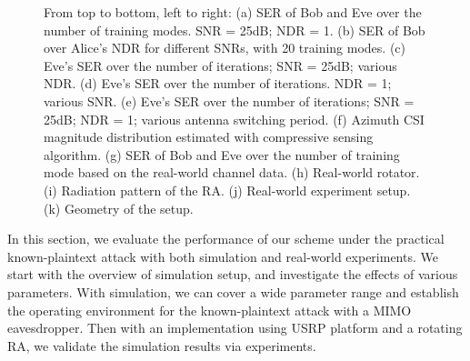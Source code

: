 \begin{figure}[t]
\begin{subfigure}[t]{0.22\textwidth}
\end{subfigure}
\caption{From top to bottom, left to right: (a) SER of Bob and Eve over the number of training modes. SNR = 25dB; NDR = 1. (b) SER of Bob over Alice's NDR for different SNRs, with 20 training modes. (c) Eve's SER over the number of iterations; SNR = 25dB; various NDR. (d) Eve's SER over the number of iterations. NDR = 1; various SNR. (e) Eve's SER over the number of iterations; SNR = 25dB; NDR = 1; various antenna switching period. (f) Azimuth CSI magnitude distribution estimated with compressive
sensing algorithm. (g) SER of Bob and Eve over the number of training mode based on the real-world channel data. (h) Real-world rotator. (i) Radiation pattern of the RA. (j) Real-world experiment setup. (k) Geometry of the setup.}
\label{fig:performance}
\end{figure}

In this section, we evaluate the performance of our  scheme under the practical known-plaintext attack with both simulation and real-world experiments. We start with the overview of simulation setup, and investigate the effects of various parameters. With simulation, we can cover a wide parameter range and establish the operating environment for the known-plaintext attack with a MIMO eavesdropper. Then with an implementation using USRP platform and a rotating RA, we validate the simulation results via experiments. 

